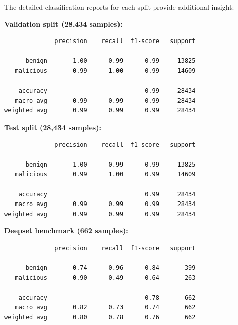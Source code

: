\documentclass[12pt, letterpaper]{article}   %
\begin{document}
\begin{table}[h!]
    \centering
    \renewcommand{\arraystretch}{1.5}
    \caption{Performance of the fine-tuned RoBERTa-large model across all evaluation splits.}
    \label{tab:roberta_results}
\end{table}

The detailed classification reports for each split provide additional insight:

\textbf{Validation split (28,434 samples):}
\begin{verbatim}
              precision    recall  f1-score   support

      benign       1.00      0.99      0.99     13825
   malicious       0.99      1.00      0.99     14609

    accuracy                           0.99     28434
   macro avg       0.99      0.99      0.99     28434
weighted avg       0.99      0.99      0.99     28434
\end{verbatim}

\textbf{Test split (28,434 samples):}
\begin{verbatim}
              precision    recall  f1-score   support

      benign       1.00      0.99      0.99     13825
   malicious       0.99      1.00      0.99     14609

    accuracy                           0.99     28434
   macro avg       0.99      0.99      0.99     28434
weighted avg       0.99      0.99      0.99     28434
\end{verbatim}

\textbf{Deepset benchmark (662 samples):}
\begin{verbatim}
              precision    recall  f1-score   support

      benign       0.74      0.96      0.84       399
   malicious       0.90      0.49      0.64       263

    accuracy                           0.78       662
   macro avg       0.82      0.73      0.74       662
weighted avg       0.80      0.78      0.76       662
\end{verbatim}
\end{document}
